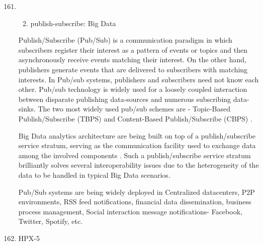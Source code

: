 \begin{enumerate}
\setcounter{enumi}{160}
\item {} \begin{enumerate}
\setcounter{enumi}{1}
\item {} 
publish-subscribe: Big Data

\end{enumerate}

Publish/Subscribe (Pub/Sub) \label{\detokenize{i524/technologies:id305}}{\hyperref[\detokenize{i524/technologies:thesis-pub-sub}]{\sphinxcrossref{{[}257{]}}}} is a
communication paradigm in which subscribers register their
interest as a pattern of events or topics and then asynchronously
receive events matching their interest. On the other hand,
publishers generate events that are delivered to subscribers with
matching interests.  In Pub/sub systems, publishers and
subscribers need not know each other. Pub/sub technology is
widely used for a loosely coupled interaction between disparate
publishing data-sources and numerous subscribing data-sinks. The
two most widely used pub/sub schemes are - Topic-Based
Publish/Subscribe (TBPS) and Content-Based Publish/Subscribe
(CBPS) \label{\detokenize{i524/technologies:id306}}{\hyperref[\detokenize{i524/technologies:paper-pub-sub}]{\sphinxcrossref{{[}258{]}}}}.

Big Data analytics architecture are being built on top of a
publish/subscribe service stratum, serving as the communication
facility used to exchange data among the involved components
\label{\detokenize{i524/technologies:id307}}{\hyperref[\detokenize{i524/technologies:paper-pub-sub-bigdata}]{\sphinxcrossref{{[}259{]}}}}. Such a publish/subscribe service
stratum brilliantly solves several interoperability issues due to
the heterogeneity of the data to be handled in typical Big Data
scenarios.

Pub/Sub systems are being widely deployed in Centralized
datacenters, P2P environments, RSS feed notifications, financial
data dissemination, business process management, Social
interaction message notifications- Facebook, Twitter, Spotify,
etc.

\item {} 
HPX-5


\end{enumerate}
